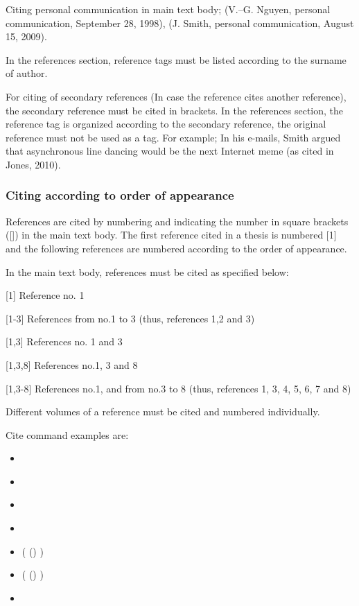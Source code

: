 Citing personal communication in main text body; (V.–G. Nguyen, personal communication, September 28, 1998), (J. Smith, personal communication, August 15, 2009).

In the references section, reference tags must be listed according to the surname of author. 

For citing of secondary references (In case the reference cites another reference), the secondary reference must be cited in brackets.  In the references section, the reference tag is organized according to the secondary reference, the original reference must not be used as a tag. For example; In his e-mails, Smith argued that asynchronous line dancing would be the next Internet meme (as cited in Jones, 2010).

\subsubsection{Citing according to order of appearance}

References are cited by numbering and indicating the number in square brackets ([]) in the main text body. The first reference cited in a thesis is numbered [1] and the following references are numbered according to the order of appearance.

In the main text body, references must be cited as specified below:

[1]	Reference no. 1

[1-3]	References from no.1 to 3 (thus, references 1,2 and 3)

[1,3]	References no. 1 and 3

[1,3,8]	References no.1, 3 and 8

[1,3-8]	References no.1, and from no.3 to 8 (thus, references 1, 3, 4, 5, 6, 7 and 8)

Different volumes of a reference must be cited and numbered individually.

Cite command examples are:

\begin{itemize}
    \item \cite{sisaky}
    \item \citep{sisaky}
    \item \citet{sisaky}
    \item \citet*{sisaky}
    \item (\citeauthor{sisaky} (\citeyear{sisaky}) \citep{sisaky})
    \item (\citeauthor*{sisaky} (\citeyear{sisaky}) \citep{sisaky})
    \item \citet[\chaptername\ \ref{ch:ch4}]{sisaky} 
  \end{itemize}

